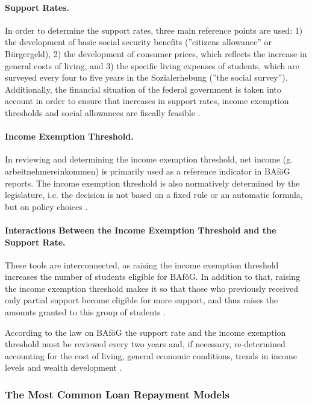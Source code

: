 \paragraph{Support Rates.}
In order to determine the support rates, three main reference points are used: 1) the development of basic social security benefits (”citizens allowance” or Bürgergeld), 2) the development of consumer prices, which reflects the increase in general costs of living, and 3) the specific living expenses of students, which are surveyed every four to five years in the Sozialerhebung (”the social survey”). Additionally, the financial situation of the federal government is taken into account in order to ensure that increases in support rates, income exemption thresholds and social allowances are fiscally feasible \citep{meier_bafog_2024}.

\paragraph{Income Exemption Threshold.}
In reviewing and determining the income exemption threshold, net income (g. arbeitnehmereinkommen) is primarily used as a reference indicator in BAföG reports. The income exemption threshold is also normatively determined by the legislature, i.e. the decision is not based on a fixed rule or an automatic formula, but on policy choices \citep{meier_bafog_2024}.


\paragraph{Interactions Between the Income Exemption Threshold and the Support Rate.}
These tools are interconnected, as raising the income exemption threshold increases the number of students eligible for BAföG. In addition to that, raising the income exemption threshold makes it so that those who previously received only partial support become eligible for more support, and thus raises the amounts granted to this group of students \citep{meier_bafog_2024}.

According to the law on BAföG the support rate and the income exemption threshold must be reviewed every two years and, if necessary, re-determined accounting for the cost of living, general economic conditions, trends in income levels and wealth development \citep{meier_bafog_2024}.


\subsubsection{The Most Common Loan Repayment Models}
\label{subsection:loan-repayment-plan}

